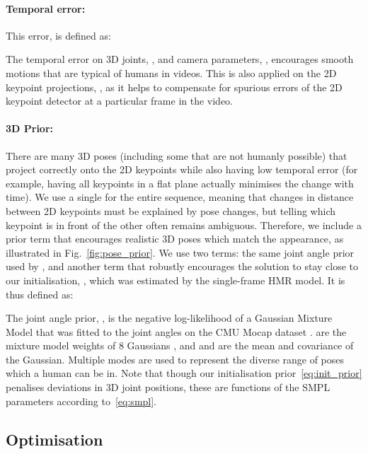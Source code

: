 \documentclass[10pt,twocolumn,letterpaper]{article}
\begin{document}
\paragraph{Temporal error:}
This error,  is defined as:

The temporal error on 3D joints, , and camera parameters, , encourages smooth motions that are typical of humans in videos.
This is also applied on the 2D keypoint projections, , as it helps to compensate for spurious errors of the 2D keypoint detector at a particular frame in the video. 

\paragraph{3D Prior:}
There are many 3D poses (including some that are not humanly possible) that project correctly onto the 2D keypoints while also having low temporal error (for example, having all keypoints in a flat plane actually minimises the change with time).  
We use a single  for the entire sequence, meaning that changes in distance between 2D keypoints must be explained by pose changes, but telling which keypoint is in front of the other often remains ambiguous.
Therefore, we include a prior term that encourages realistic 3D poses which match the appearance, as illustrated in Fig.~\ref{fig:pose_prior}. 
We use two terms: the same joint angle prior used by \cite{bogo_eccv_2016, huang_3dv_2017, lassner_cvpr_2017}, and another term that robustly encourages the solution to stay close to our initialisation, , which was estimated by the single-frame HMR model.
It is thus defined as:

The joint angle prior, , is the negative log-likelihood of a Gaussian Mixture Model that was fitted to the joint angles on the CMU Mocap dataset \cite{cmu_mocap}.
 are the mixture model weights of 8 Gaussians \cite{bogo_eccv_2016, huang_3dv_2017, lassner_cvpr_2017}, and  and  are the mean and covariance of the  Gaussian.
Multiple modes are used to represent the diverse range of poses which a human can be in.
Note that though our initialisation prior~\eqref{eq:init_prior} penalises deviations in 3D joint positions, these are functions of the SMPL parameters according to~\eqref{eq:smpl}.


\subsection{Optimisation}
\label{sec:optimisation}
\end{document}
